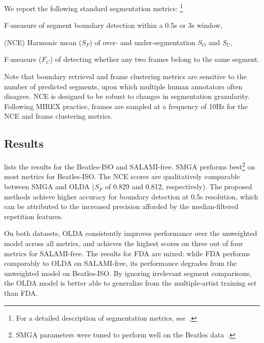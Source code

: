 \documentclass{article}
\begin{document}
We report the following standard segmentation metrics:
\footnote{For a detailed description of segmentation metrics, see~\cite{mirexstructure}.}
\begin{description}\addtolength{\itemsep}{-0.25\baselineskip}%
\item[Boundary retrieval] F-measure of segment boundary detection within a 0.5s or 3s window,
\item[Normalized conditional entropy] (NCE) Harmonic mean ($S_F$) of over- and under-segmentation $S_O$ and $S_U$, 
\item[Frame clustering] F-measure ($F_C$) of detecting whether any two frames belong to the same segment.
\end{description}
Note that boundary retrieval and frame clustering metrics are sensitive to the number of
predicted segments, upon which multiple human annotators often disagree.
NCE is designed to be robust to changes in segmentation granularity.
Following MIREX practice, frames are sampled at a frequency of 10Hz for the NCE and frame clustering metrics. 


\subsection{Results}
\label{sec:results}


 lists the results for the Beatles-ISO and SALAMI-free.
SMGA performs best\footnote{SMGA parameters were tuned to perform well on the Beatles data~\cite{serra2012unsupervised}.}
on most metrics for Beatles-ISO.\@
The NCE scores are qualitatively comparable between SMGA and OLDA ($S_F$ of 0.829 and 0.812, respectively).
The proposed methods achieve higher accuracy for boundary detection at 0.5s resolution, which can be attributed to the increased
precision afforded by the median-filtered repetition features.

On both datasets, OLDA consistently improves performance over the unweighted model across all metrics, and achieves the highest scores on three out of four metrics for SALAMI-free.
The results for FDA are mixed: while FDA performs comparably to OLDA on SALAMI-free, its performance degrades from the unweighted model on Beatles-ISO.\@
By ignoring irrelevant segment comparisons, the OLDA model is better able to generalize from the multiple-artist training set than FDA.\@
\end{document}
